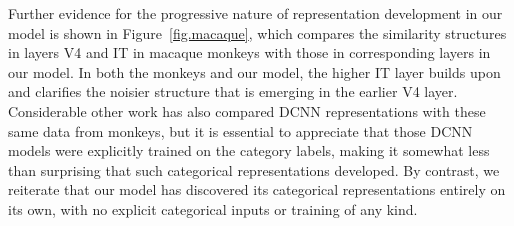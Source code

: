 \documentclass[12pt,twoside]{naturefigs}  %
\newif\myifpdf
\begin{document}
Further evidence for the progressive nature of representation development in our model is shown in Figure~\ref{fig.macaque}, which compares the similarity structures in layers V4 and IT in macaque monkeys\cite{CadieuHongYaminsEtAl14} with those in corresponding layers in our model.  In both the monkeys and our model, the higher IT layer builds upon and clarifies the noisier structure that is emerging in the earlier V4 layer.  Considerable other work has also compared DCNN representations with these same data from monkeys\cite{CadieuHongYaminsEtAl14}, but it is essential to appreciate that those DCNN models were explicitly trained on the category labels, making it somewhat less than surprising that such categorical representations developed.  By contrast, we reiterate that our model has discovered its categorical representations entirely on its own, with no explicit categorical inputs or training of any kind.

\end{document}

